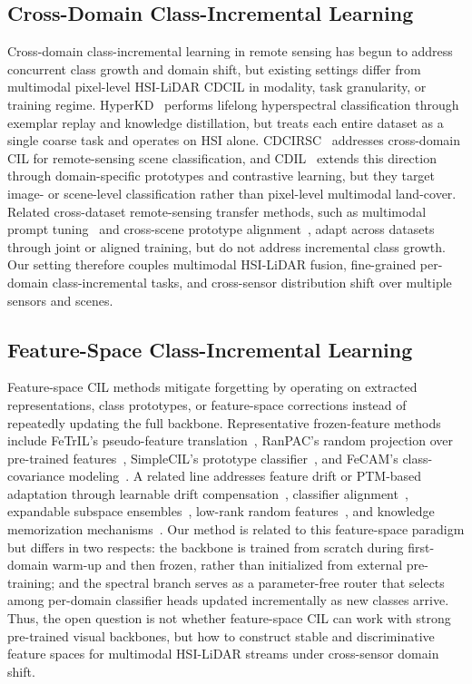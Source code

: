 \subsection{Cross-Domain Class-Incremental Learning}

Cross-domain class-incremental learning in remote sensing has begun to address concurrent class growth and domain shift, but existing settings differ from multimodal pixel-level HSI-LiDAR CDCIL in modality, task granularity, or training regime.
HyperKD~\cite{li2025hyperkd} performs lifelong hyperspectral classification through exemplar replay and knowledge distillation, but treats each entire dataset as a single coarse task and operates on HSI alone.
CDCIRSC~\cite{zhang2024cdcirssc} addresses cross-domain CIL for remote-sensing scene classification, and CDIL~\cite{tian2026cdil} extends this direction through domain-specific prototypes and contrastive learning, but they target image- or scene-level classification rather than pixel-level multimodal land-cover.
Related cross-dataset remote-sensing transfer methods, such as multimodal prompt tuning~\cite{liu2025prompt} and cross-scene prototype alignment~\cite{xie2024prototype}, adapt across datasets through joint or aligned training, but do not address incremental class growth.
Our setting therefore couples multimodal HSI-LiDAR fusion, fine-grained per-domain class-incremental tasks, and cross-sensor distribution shift over multiple sensors and scenes.

\subsection{Feature-Space Class-Incremental Learning}

Feature-space CIL methods mitigate forgetting by operating on extracted representations, class prototypes, or feature-space corrections instead of repeatedly updating the full backbone.
Representative frozen-feature methods include FeTrIL's pseudo-feature translation~\cite{petit2023fetril}, RanPAC's random projection over pre-trained features~\cite{mcdonnell2023ranpac}, SimpleCIL's prototype classifier~\cite{zhou2025simplecil}, and FeCAM's class-covariance modeling~\cite{goswami2023fecam}.
A related line addresses feature drift or PTM-based adaptation through learnable drift compensation~\cite{gomezvilla2024ldc}, classifier alignment~\cite{gao2023slca}, expandable subspace ensembles~\cite{zhou2024ease}, low-rank random features~\cite{liang2025loranpac}, and knowledge memorization mechanisms~\cite{gao2025kmr}.
Our method is related to this feature-space paradigm but differs in two respects: the backbone is trained from scratch during first-domain warm-up and then frozen, rather than initialized from external pre-training; and the spectral branch serves as a parameter-free router that selects among per-domain classifier heads updated incrementally as new classes arrive.
Thus, the open question is not whether feature-space CIL can work with strong pre-trained visual backbones, but how to construct stable and discriminative feature spaces for multimodal HSI-LiDAR streams under cross-sensor domain shift.
